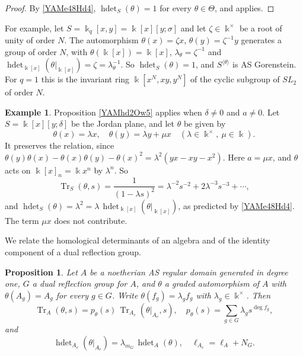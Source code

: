 \documentclass[reqno]{amsart}
\numberwithin{equation}{section}
\newtheorem{proposition}[equation]{Proposition}
\theoremstyle{definition}
\newtheorem{example}[equation]{Example}
\theoremstyle{remark}
\theoremstyle{plain}
\newcommand{\kk}{\Bbbk}
\DeclareMathOperator{\hdet}{hdet}
\DeclareMathOperator{\Tr}{Tr}
\begin{document}
\begin{proof}
By \eqref{YAMe48Hd4}, $\hdet_S(\theta)=1$ for every $\theta\in\Theta$, and \cite[Theorem 3.3]{JZ} applies.
\end{proof}

For example, let $S=\kk_q[x,y]=\kk[x][y;\sigma]$ and let $\zeta\in\kk^\times$ be a root of unity of order $N$. The automorphism $\theta(x)=\zeta x$, $\theta(y)=\zeta^{-1}y$ generates a group of order $N$, with $\theta(\kk[x])=\kk[x]$, $\lambda_\theta=\zeta^{-1}$ and $\hdet_{\kk[x]}(\theta|_{\kk[x]})=\zeta=\lambda_\theta^{-1}$. So $\hdet_S(\theta)=1$, and $S^{\langle\theta\rangle}$ is AS Gorenstein. For $q=1$ this is the invariant ring $\kk[x^N,xy,y^N]$ of the cyclic subgroup of $SL_2$ of order $N$.

\begin{example}\label{YAMex15Jt8}
Proposition \ref{YAMhd2Ow5} applies when $\delta\neq0$ and $a\neq0$. Let $S=\kk[x][y;\delta]$ be the Jordan plane, and let $\theta$ be given by
\[
\theta(x)=\lambda x,\quad\theta(y)=\lambda y+\mu x\quad(\lambda\in\kk^\times,\ \mu\in\kk).
\]
It preserves the relation, since $\theta(y)\theta(x)-\theta(x)\theta(y)-\theta(x)^2=\lambda^2(yx-xy-x^2)$. Here $a=\mu x$, and $\theta$ acts on $\kk[x]_n=\kk x^n$ by $\lambda^n$. So
\[
\Tr_S(\theta,s)=\frac{1}{(1-\lambda s)^2}=\lambda^{-2}s^{-2}+2\lambda^{-3}s^{-3}+\cdots,
\]
and $\hdet_S(\theta)=\lambda^2=\lambda\,\hdet_{\kk[x]}(\theta|_{\kk[x]})$, as predicted by \eqref{YAMe48Hd4}. The term $\mu x$ does not contribute.
\end{example}

We relate the homological determinants of an algebra and of the identity component of a dual reflection group.

\begin{proposition}\label{YAMhd7Iu1}
Let $A$ be a noetherian AS regular domain generated in degree one, $G$ a dual reflection group for $A$, and $\theta$ a graded automorphism of $A$ with $\theta(A_g)=A_g$ for every $g\in G$. Write $\theta(f_g)=\lambda_gf_g$ with $\lambda_g\in\kk^\times$. Then
\begin{equation}\label{YAMe51Pt7}
\Tr_A(\theta,s)=p_\theta(s)\,\Tr_{A_e}(\theta|_{A_e},s),\quad p_\theta(s)=\sum_{g\in G}\lambda_gs^{\deg f_g},
\end{equation}
and
\begin{equation}\label{YAMe50Hr6}
\hdet_{A_e}(\theta|_{A_e})=\lambda_{m_G}\,\hdet_A(\theta),\quad\ell_{A_e}=\ell_A+N_G.
\end{equation}
\end{proposition}
\end{document}
